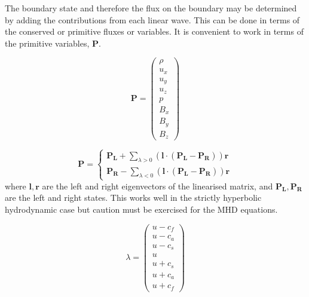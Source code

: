 The boundary state and therefore the flux on the boundary may be determined by adding the contributions from each linear wave.
This can be done in terms of the conserved or primitive fluxes or variables.
It is convenient to work in terms of the primitive variables, $\mathbf{P}$.

\begin{equation}
\mathbf{P}=\left(
\begin{array}{c}
\rho \\
u_x \\
u_y \\
u_z \\
p \\
B_x \\
B_y \\
B_z 
\end{array}
\right)
\end{equation}

\begin{equation}
\mathbf{P} =
\left\{
\begin{array}{c}
\mathbf{P_L} + \sum_{\lambda > 0} \left( \mathbf{l} \cdot\left( \mathbf{P_L -P_R} \right)\right)  \mathbf{ r}  \\
\mathbf{P_R} - \sum_{\lambda < 0} \left( \mathbf{l} \cdot\left( \mathbf{P_L -P_R} \right) \right)  \mathbf{ r} 
\end{array}
\right. 
\end{equation}
where $\mathbf{l,r}$ are the left and right eigenvectors of the linearised matrix,
and $\mathbf{P_L} , \mathbf{P_R} $ are the left and right states.
This works well in the strictly hyperbolic hydrodynamic case but caution must be exercised for the MHD equations.

\begin{equation}
\lambda=\left(
\begin{array}{c}
u-c_f \\
u-c_a \\
u-c_s \\
u \\
u+c_s \\
u+c_a \\
u+c_f 
\end{array}
\right)
\end{equation}

